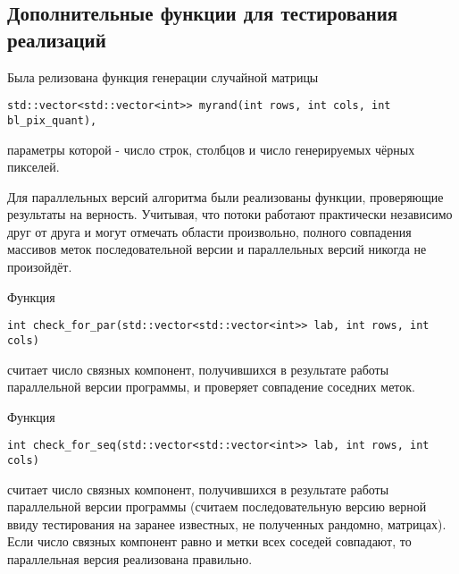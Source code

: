 \documentclass{report}
\begin{document}
\subsection{Дополнительные функции для тестирования реализаций}
Была релизована функция генерации случайной матрицы
\begin{lstlisting}
std::vector<std::vector<int>> myrand(int rows, int cols, int bl_pix_quant),
\end{lstlisting}
параметры которой - число строк, столбцов и число генерируемых чёрных пикселей.
\par Для параллельных версий алгоритма были реализованы функции, проверяющие результаты на верность. Учитывая, что потоки работают практически независимо друг от друга и могут отмечать области произвольно, полного совпадения массивов меток последовательной версии и параллельных версий никогда не произойдёт.
\par Функция
\begin{lstlisting}
int check_for_par(std::vector<std::vector<int>> lab, int rows, int cols)
\end{lstlisting}
считает число связных компонент, получившихся в результате работы параллельной версии программы, и проверяет совпадение соседних меток. 
\par Функция 
\begin{lstlisting}
int check_for_seq(std::vector<std::vector<int>> lab, int rows, int cols)
\end{lstlisting}
считает число связных компонент, получившихся в результате работы параллельной версии программы (считаем последовательную версию верной ввиду тестирования на заранее известных, не полученных рандомно, матрицах).
Если число связных компонент равно и метки всех соседей совпадают, то параллельная версия реализована правильно.
\newpage
\end{document}
